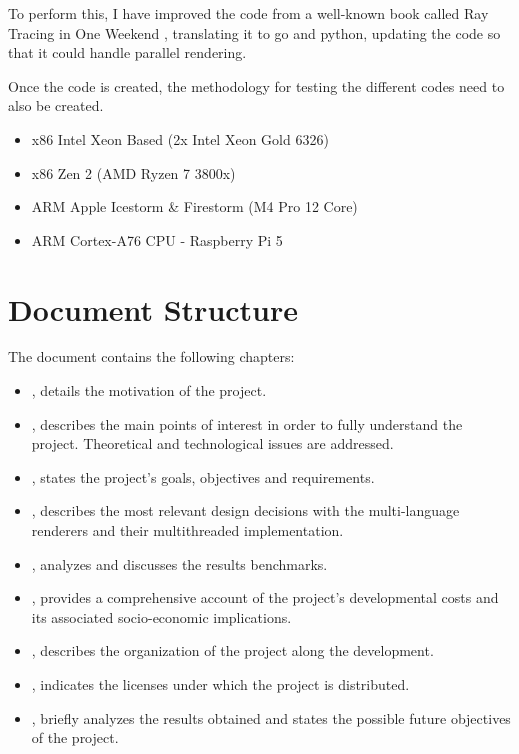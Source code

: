 To perform this, I have improved the code from a well-known book called Ray Tracing in One Weekend
\cite{Shirley2016RTW1}, translating it to go and python, updating the code so that it could handle parallel rendering. 

Once the code is created, the methodology for testing the different codes need to also be created. \begin{itemize}
    \item x86 Intel Xeon Based (2x Intel Xeon Gold 6326)
    \item x86 Zen 2 (AMD Ryzen 7 3800x)
    \item ARM Apple Icestorm \& Firestorm (M4 Pro 12 Core)
    \item ARM Cortex-A76 CPU - Raspberry Pi 5
\end{itemize} 

\section{Document Structure}\label{sec:structure}
The document contains the following chapters:
\begin{itemize}
  \item {}, details the motivation of the project.
  \item {}, describes the main points of interest in order to fully understand the project. Theoretical and technological issues are addressed.
  \item {}, states the project's goals, objectives and requirements.
  \item {}, describes the most relevant design decisions with the multi-language renderers and their multithreaded implementation.
  \item {}, analyzes and discusses the results benchmarks.
  \item {}, provides a comprehensive account of the project's developmental costs and its associated socio-economic implications.
  \item {}, describes the organization of the project along the development.
  \item {}, indicates the licenses under which the project is distributed.
  \item {}, briefly analyzes the results obtained and states the possible future objectives of the project.
\end{itemize}
